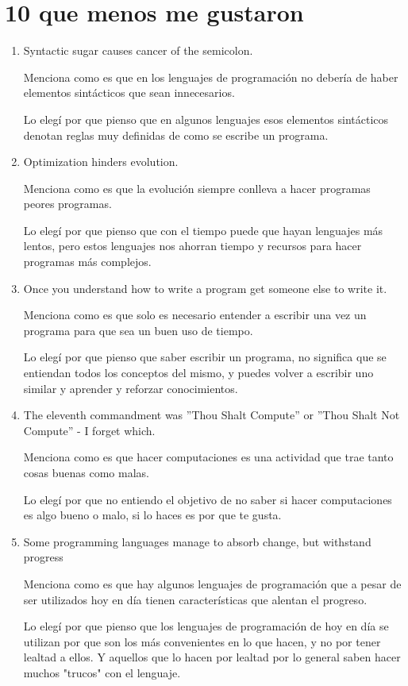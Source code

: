 \documentclass{article}
\begin{document}
\section{10 que menos me gustaron}
\begin{enumerate}
    \item Syntactic sugar causes cancer of the semicolon.
    \par Menciona como es que en los lenguajes de programación no debería de haber elementos sintácticos que sean innecesarios.
    \par Lo elegí por que pienso que en algunos lenguajes esos elementos sintácticos denotan reglas muy definidas de como se escribe un programa.
    \item Optimization hinders evolution.
    \par Menciona como es que la evolución siempre conlleva a hacer programas peores programas.
    \par Lo elegí por que pienso que con el tiempo puede que hayan lenguajes más lentos, pero estos lenguajes nos ahorran tiempo y recursos para hacer programas más complejos.
    \item Once you understand how to write a program get someone else to write it.
    \par Menciona como es que solo es necesario entender a escribir una vez un programa para que sea un buen uso de tiempo. 
    \par Lo elegí por que pienso que saber escribir un programa, no significa que se entiendan todos los conceptos del mismo, y puedes volver a escribir uno similar y aprender y reforzar conocimientos.
    \item The eleventh commandment was ”Thou Shalt Compute” or ”Thou Shalt Not Compute” - I forget which.
    \par Menciona como es que hacer computaciones es una actividad que trae tanto cosas buenas como malas.
    \par Lo elegí por que no entiendo el objetivo de no saber si hacer computaciones es algo bueno o malo, si lo haces es por que te gusta.
    \item Some programming languages manage to absorb change, but withstand progress
    \par Menciona como es que hay algunos lenguajes de programación que a pesar de ser utilizados hoy en día tienen características que alentan el progreso.
    \par Lo elegí por que pienso que los lenguajes de programación de hoy en día se utilizan por que son los más convenientes en lo que hacen, y no por tener lealtad a ellos. Y aquellos que lo hacen por lealtad por lo general saben hacer muchos "trucos" con el lenguaje. 

\end{enumerate}
\end{document}
